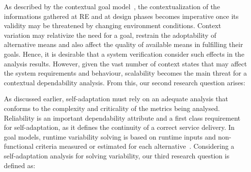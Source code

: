 

As described by the contextual goal model~\cite{Ali:2010}, the contextualization of the informations gathered at RE and at design phases becomes imperative once its validity may be threatened by changing environment conditions. Context variation may relativize the need for a goal, restrain the adoptability of alternative means and also affect the quality of available means in fulfilling their goals. Hence, it is desirable that a system verification consider such effects in the analysis results. However, given the vast number of context states that may affect the system requirements and behaviour, scalability becomes the main threat for a contextual dependability analysis. From this, our second research question arises:

\bigskip

\noindent{}\bigskip



As discussed earlier, self-adaptation must rely on an adequate analysis that conforms to the complexity and criticality of the metrics being analysed. Reliability is an important dependability attribute and a first class requirement for self-adaptation, as it defines the continuity of a correct service delivery. In goal models, runtime variability solving is based on runtime inputs and non-functional criteria measured or estimated for each alternative~\cite{Yu:2008}. Considering a self-adaptation analysis for solving variability, our third research question is defined as:

\bigskip

\setlength{\fboxsep}{10pt}
\noindent{}\bigskip

